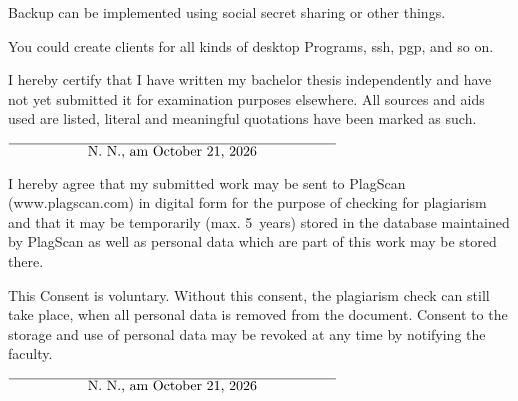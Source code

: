 \documentclass[12pt,twoside,a4paper,parskip]{scrbook}
\def\BaAuthor{Achim Winter}
\def\ShowBaAuthor{\BaAuthor}
\def\ShowBaAuthor{N.~N.}
\begin{document}
Backup can be implemented using social secret sharing or other things.

You could create clients for all kinds of desktop Programs, ssh, pgp, and so on.

\parencite{gamma2011patterns}

\backmatter

\listoffigures
{}

\listoftables


\cleardoublepage
{}
{}
\printbibliography



I hereby certify that I have written my bachelor thesis independently and have not yet submitted it for examination purposes elsewhere. All sources and aids used are listed, literal and meaningful quotations have been marked as such.

\vspace{20pt}
\begin{flushright}
$\overline{~~~~~~~~~~~~~~~~~\mbox{\ShowBaAuthor, am \today}~~~~~~~~~~~~~~~~~}$
\end{flushright}


I hereby agree that my submitted work may be sent to PlagScan (www.plagscan.com) in digital form for the purpose of checking for plagiarism and that it may be temporarily (max. 5~years) stored in the database maintained by PlagScan as well as personal data which are part of this work may be stored there.

\begin{small}
This Consent is voluntary. Without this consent, the plagiarism check can still take place, when all personal data is removed from the document. Consent to the storage and use of personal data may be revoked at any time by notifying the faculty.
\end{small}

\vspace{20pt}
\begin{flushright}
$\overline{~~~~~~~~~~~~~~~~~\mbox{\ShowBaAuthor, am \today}~~~~~~~~~~~~~~~~~}$
\end{flushright}
\end{document}
